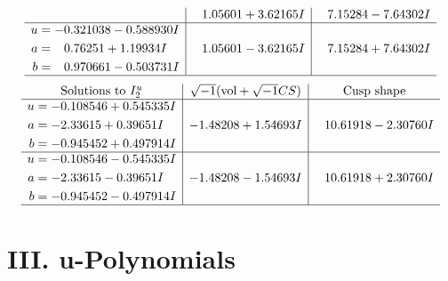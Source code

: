 \documentclass[1p]{elsarticle_modified}
\theoremstyle{definition}
\newcommand{\I}{\sqrt{-1}}
\begin{document}
$$\begin{array}{c|c|c}
 & \phantom{-}1.05601 + 3.62165 I & \phantom{-}7.15284 - 7.64302 I \\ \hline\begin{aligned}
u &= -0.321038 - 0.588930 I \\
a &= \phantom{-}0.76251 + 1.19934 I \\
b &= \phantom{-}0.970661 - 0.503731 I\end{aligned}
 & \phantom{-}1.05601 - 3.62165 I & \phantom{-}7.15284 + 7.64302 I\\
 \hline 
 \end{array}$$\newpage$$\begin{array}{c|c|c}  
\text{Solutions to }I^u_{2}& \I (\text{vol} + \sqrt{-1}CS) & \text{Cusp shape}\\
 \hline 
\begin{aligned}
u &= -0.108546 + 0.545335 I \\
a &= -2.33615 + 0.39651 I \\
b &= -0.945452 + 0.497914 I\end{aligned}
 & -1.48208 + 1.54693 I & \phantom{-}10.61918 - 2.30760 I \\ \hline\begin{aligned}
u &= -0.108546 - 0.545335 I \\
a &= -2.33615 - 0.39651 I \\
b &= -0.945452 - 0.497914 I\end{aligned}
 & -1.48208 - 1.54693 I & \phantom{-}10.61918 + 2.30760 I\\
 \hline 
 \end{array}$$\newpage
\newpage\renewcommand{\arraystretch}{1}
\centering \section*{ III. u-Polynomials}
\end{document}
